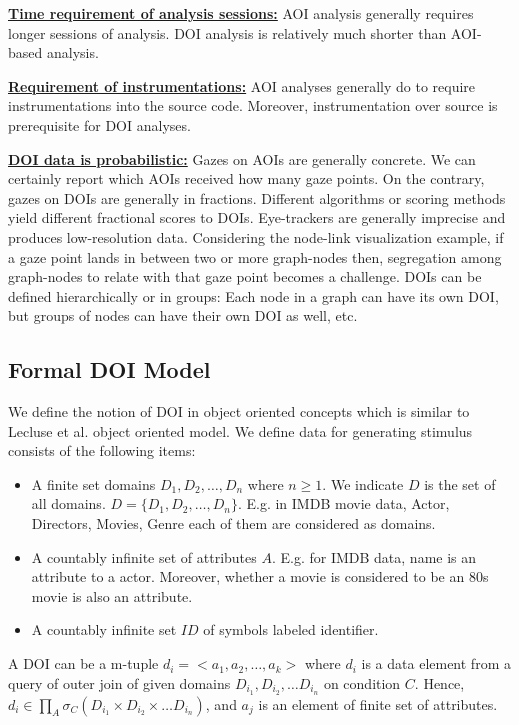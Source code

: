 \textbf{\underline{Time requirement of analysis sessions:}} AOI analysis generally requires longer sessions of analysis. DOI analysis is relatively much shorter than AOI-based analysis.

\textbf{\underline{Requirement of instrumentations:}} AOI analyses generally do to require instrumentations into the source code. Moreover, instrumentation over source is prerequisite for DOI analyses. 

\textbf{\underline{DOI data is probabilistic:}}  Gazes on AOIs are generally concrete. We can certainly report which AOIs received how many gaze points. On the contrary, gazes on DOIs are generally in fractions. Different algorithms or scoring methods yield different fractional scores to DOIs. Eye-trackers are generally imprecise and produces low-resolution data. Considering the node-link visualization example, if a gaze point lands in between two or more graph-nodes then, segregation among graph-nodes to relate with that gaze point becomes a challenge. 
DOIs can be defined hierarchically or in groups: Each node in a graph can have its own DOI, but groups of nodes can have their own DOI as well, etc.

\subsection{Formal DOI Model}

We define the notion of DOI in object oriented concepts which is similar to Lecluse et al. \cite{lecluse1988o2} object oriented model. 
We define data for generating stimulus consists of the following items:
\begin{itemize}
	\item A finite set domains $D_1, D_2, \ldots, D_n$ where $n \geq 1$. We indicate $D$ is the set of all domains. $D = \{D_1, D_2, \ldots, D_n\}$. E.g. in IMDB movie data, Actor, Directors, Movies, Genre each of them are considered as domains.
	\item A countably infinite set of attributes $A$. E.g. for IMDB data, name is an attribute to a actor. Moreover, whether a movie is considered to be an 80s movie is also an attribute. 
	\item A countably infinite set $ID$ of symbols labeled identifier. 
\end{itemize}

A DOI can be a m-tuple $d_i= <a_1 , a_2, \ldots, a_k>$ where $d_i$ is a data element from a query of outer join of given domains $D_{i_1}, D_{i_2}, \ldots D_{i_n}$ on condition $C$. Hence, $d_i \in \prod_{A} \sigma _{C} (D_{i_1} \times D_{i_2} \times \ldots D_{i_n})$, and $a_j$ is an element of finite set of attributes. 

